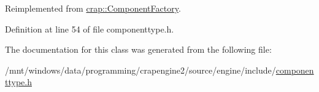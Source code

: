 Reimplemented from \hyperlink{classcrap_1_1_component_factory_ad8b34d3eed2f0330ad49ea918bd56ba8}{crap\+::\+Component\+Factory}.



Definition at line 54 of file componenttype.\+h.



The documentation for this class was generated from the following file\+:\begin{DoxyCompactItemize}
\item 
/mnt/windows/data/programming/crapengine2/source/engine/include/\hyperlink{componenttype_8h}{componenttype.\+h}\end{DoxyCompactItemize}
